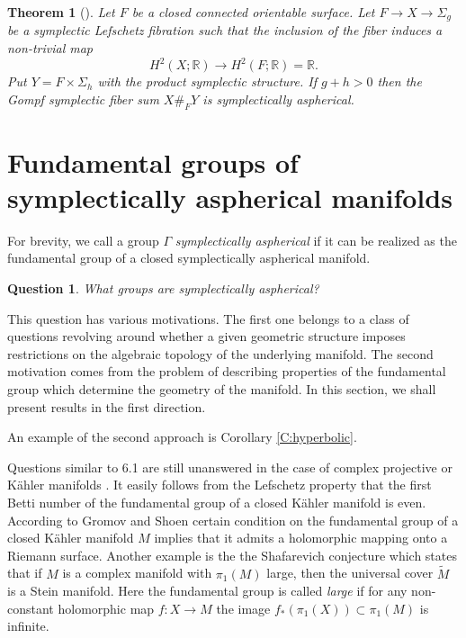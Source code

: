 \documentclass[12pt]{amsart}
\newcommand{\B}[1]{{\mathbb #1}}
\newtheorem{theorem}[subsection]{Theorem}%
\newtheorem{question}[subsection]{Question}
\numberwithin{equation}{section}
\theoremstyle{definition}
\theoremstyle{remark}
\numberwithin{figure}{section}
\numberwithin{table}{section}
\newcommand{\Si}{{\Sigma}}
\newcommand{\ms}{{\medskip}}
\begin{document}
\begin{theorem}[{\cite[Proposition 3.3]{KRT}}] 
\label{T:lefschetz} 
Let $F$ be a closed connected orientable surface.  
Let $F\to X \to \Si_g$ be a symplectic Lefschetz fibration 
such that the inclusion of the fiber induces a 
non-trivial map  
$$ 
H^2(X;\B R)\to H^2(F;\B R)=\B R. 
$$ 
Put $Y =F\times \Si_h$ with the product symplectic structure.  
If $g+h>0$ then the Gompf symplectic 
fiber sum $X \#_F Y$ is symplectically aspherical. 
\end{theorem} 
 
\section{Fundamental groups of symplectically aspherical 
manifolds}\label{S:group} 
 
\ms For brevity, we call a group $\Gamma$ {\it symplectically aspherical} if it  
can be realized as the fundamental group of a closed symplectically aspherical  
manifold. 
\begin{question}\label{Q:group} 
What groups are symplectically aspherical? 
\end{question} 
 
This question has various motivations. 
The first  one belongs to a class of questions revolving around whether  a given 
geometric structure  
imposes  
restrictions on the algebraic topology of the underlying 
manifold. The second motivation comes from the problem of describing  properties 
of the fundamental group which  
determine the geometry of the manifold. In this section,  
we shall present  results in the first direction. 
 
An example of the second approach is Corollary \ref{C:hyperbolic}. 
 
\ms 
Questions similar to 6.1 are still unanswered in the case of complex 
projective or K\"ahler manifolds \cite{ABCKT}. It easily follows 
from the Lefschetz property that the first Betti number of the 
fundamental group of a closed K\"ahler manifold is even. 
According to Gromov and Shoen certain condition on the 
fundamental group of a closed K\"ahler manifold $M$ 
implies that it admits a  holomorphic 
mapping onto a Riemann surface. Another example is the 
the Shafarevich conjecture which  
states that if $M$ is a complex manifold with  $\pi_1(M)$ large, then the  
universal cover  
$\widetilde M$ is a Stein manifold. Here the fundamental group 
is called {\em large} if for any non-constant holomorphic  
map $f:X\to M$ the image $f_*(\pi_1(X))\subset \pi_1(M)$ 
is infinite. 
 
\end{document}
